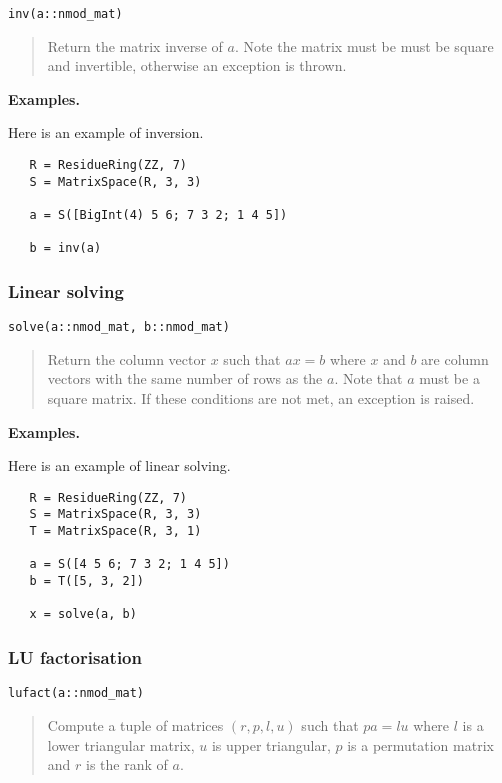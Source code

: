 \documentclass[a4paper,10pt]{article}
\newcommand{\desc}[1]{\vspace{-3mm}\begin{quote}#1\end{quote}}
\begin{document}
{{\begin{lstlisting}
inv(a::nmod_mat)
\end{lstlisting}

\desc{Return the matrix inverse of $a$. Note the matrix must be must be square and
invertible, otherwise an exception is thrown.}

\textbf{Examples.}

Here is an example of inversion.

\begin{lstlisting}
   R = ResidueRing(ZZ, 7)
   S = MatrixSpace(R, 3, 3)

   a = S([BigInt(4) 5 6; 7 3 2; 1 4 5])

   b = inv(a)
\end{lstlisting}

\subsubsection{Linear solving}

\begin{lstlisting}
solve(a::nmod_mat, b::nmod_mat)
\end{lstlisting}

\desc{Return the column vector $x$ such that $ax = b$ where $x$ and $b$ are column
vectors with the same number of rows as the $a$. Note that $a$ must be a square
matrix. If these conditions are not met, an exception is raised.}

\textbf{Examples.}

Here is an example of linear solving.

\begin{lstlisting}
   R = ResidueRing(ZZ, 7)
   S = MatrixSpace(R, 3, 3)
   T = MatrixSpace(R, 3, 1)

   a = S([4 5 6; 7 3 2; 1 4 5])
   b = T([5, 3, 2])

   x = solve(a, b)
\end{lstlisting}

\subsubsection{LU factorisation}

\begin{lstlisting}
lufact(a::nmod_mat)
\end{lstlisting}

\desc{Compute a tuple of matrices $(r, p, l, u)$ such that $pa = lu$ where $l$ is a
lower triangular matrix, $u$ is upper triangular, $p$ is a permutation matrix and
$r$ is the rank of $a$.}

}}
\end{document}
